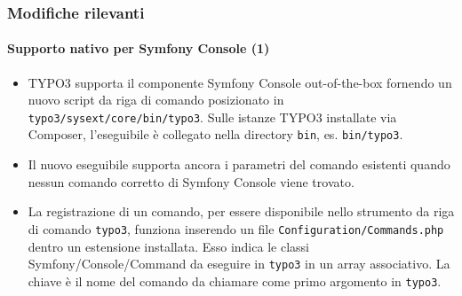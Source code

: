 \begin{frame}[fragile]
	\frametitle{Modifiche rilevanti}
	\framesubtitle{Supporto nativo per Symfony Console (1)}

	\lstset{basicstyle=\tiny\ttfamily}

	\begin{itemize}

		\item TYPO3 supporta il componente Symfony Console out-of-the-box fornendo
			un nuovo script da riga di comando posizionato in \texttt{typo3/sysext/core/bin/typo3}.
			Sulle istanze TYPO3 installate via Composer, l'eseguibile è collegato nella directory
			\texttt{bin}, es. \texttt{bin/typo3}.

		\item Il nuovo eseguibile supporta ancora i parametri del comando esistenti quando nessun
			comando corretto di Symfony Console viene trovato.

		\item La registrazione di un comando, per essere disponibile nello strumento da riga di comando \texttt{typo3},
			funziona inserendo un file \texttt{Configuration/Commands.php} dentro un estensione installata.
			Esso indica le classi Symfony/Console/Command da eseguire in
			\texttt{typo3} in un array associativo. La chiave è il nome del comando da chiamare come primo
			argomento in \texttt{typo3}.

	\end{itemize}

\end{frame}

